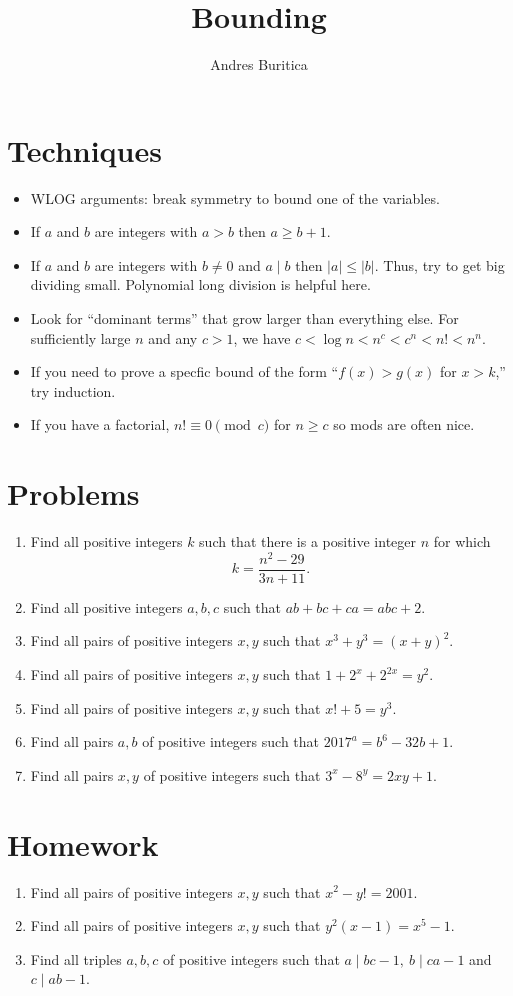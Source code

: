 \documentclass{article}
\title{Bounding}
\author{Andres Buritica}
\date{}
\begin{document}
\maketitle
\section{Techniques}
\begin{itemize}
  \item WLOG arguments: break symmetry to bound one of the variables.
  \item If $a$ and $b$ are integers with $a>b$ then $a\ge b+1$.
  \item If $a$ and $b$ are integers with $b\ne 0$ and $a\mid b$ then
    $|a|\le|b|$. Thus, try to get big dividing small. Polynomial long division
    is helpful here.
  \item Look for ``dominant terms'' that grow larger than everything else. For
    sufficiently large $n$ and any $c>1$, we have $c<\log n<n^c<c^n<n!<n^n$.
  \item If you need to prove a specfic bound of the form ``$f(x)>g(x)$ for
    $x>k$,'' try induction.
  \item If you have a factorial, $n!\equiv 0\pmod c$ for $n\ge c$ so mods are
    often nice.
\end{itemize}
\section{Problems}
\begin{enumerate}
  \item Find all positive integers $k$ such that there is a positive integer $n$
    for which
    \[k=\frac{n^2-29}{3n+11}.\]
  \item Find all positive integers $a,b,c$ such that $ab+bc+ca=abc+2$.
  \item Find all pairs of positive integers $x,y$ such that $x^3+y^3=(x+y)^2$.
  \item Find all pairs of positive integers $x,y$ such that
    $1+2^x+2^{2x}=y^2$.
  \item Find all pairs of positive integers $x,y$ such that $x!+5=y^3$.
  \item Find all pairs $a,b$ of positive integers such that $2017^a=b^6-32b+1$.
  \item Find all pairs $x,y$ of positive integers such that $3^x-8^y=2xy+1$.
\end{enumerate}
\newpage
\section{Homework}
\begin{enumerate}
  \item Find all pairs of positive integers $x,y$ such that $x^2-y!=2001$.
  \item Find all pairs of positive integers $x,y$ such that $y^2(x-1)=x^5-1$.
  \item Find all triples $a,b,c$ of positive integers such that $a\mid bc-1,\
    b\mid ca-1$ and $c\mid ab-1$.
\end{enumerate}
\end{document}
